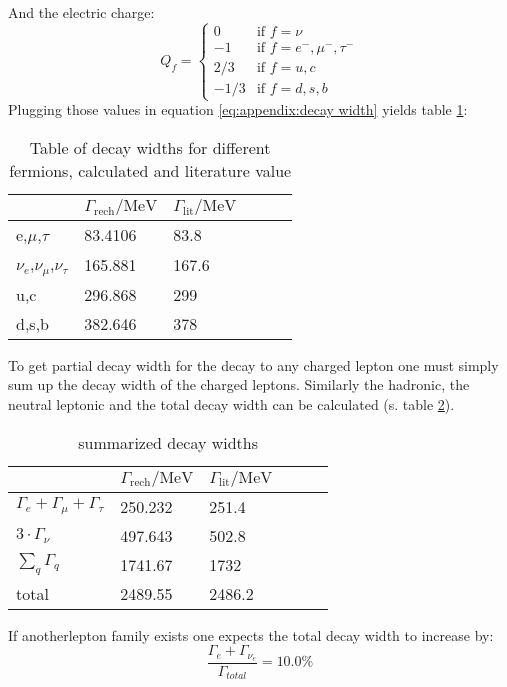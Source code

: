 And the electric charge:
\begin{equation}
Q_f = \begin{cases}
0 & \text{if } f = \nu\\
-1 & \text{if } f = e^-,\mu^-,\tau^-\\
2/3 & \text{if } f = u,c\\
-1/3 & \text{if } f = d,s,b
\end{cases}
\end{equation}
Plugging those values in equation \ref{eq:appendix:decay width} yields table \ref{tb:appendix:decay widths}:

\begin{table}[H]\centering
	\begin{tabular}{@{}llllll@{}}
		\toprule
		 & $\Gamma _{\text{rech}}\text{/MeV}$ & $\Gamma
		 _{\text{lit}}\text{/MeV}$ \\
		 \midrule
		 e,$\mu $,$\tau $ & 83.4106 & 83.8 \\
		 $\nu _e$,$\nu _{\mu }$,$\nu _{\tau }$ & 165.881 & 167.6 \\
		 u,c & 296.868 & 299 \\
		 d,s,b & 382.646 & 378 \\
		 \bottomrule
	\end{tabular}
	\caption{Table of decay widths for different fermions, calculated and literature value\cite{muenchen}}
	\label{tb:appendix:decay widths}
\end{table}
To get partial decay width for the decay to any charged lepton one must simply sum up the decay width of the charged leptons. Similarly the hadronic, the neutral leptonic and the total decay width can be calculated (s. table \ref{tb:appendix:summarized decay widths}).
\begin{table}[H]\centering
	\begin{tabular}{@{}llllll@{}}
		\toprule
		& $\Gamma _{\text{rech}}\text{/MeV}$ & $\Gamma
		_{\text{lit}}\text{/MeV}$ \\
		\midrule
		$\Gamma_e+\Gamma_{\mu}+\Gamma_{\tau}$ & 250.232 & 251.4 \\
		$3\cdot \Gamma_{\nu}$ & 497.643 & 502.8 \\
		$\sum_q\Gamma_q$ & 1741.67 & 1732 \\
		total & 2489.55 & 2486.2 \\
		\bottomrule
	\end{tabular}
	\caption{summarized decay widths}
	\label{tb:appendix:summarized decay widths}
\end{table}
If anotherlepton family exists one expects the total decay width to increase by:
\begin{equation}
\frac{\Gamma_e + \Gamma_{\nu_e}}{\Gamma_{total}}=10.0 \%
\end{equation}
